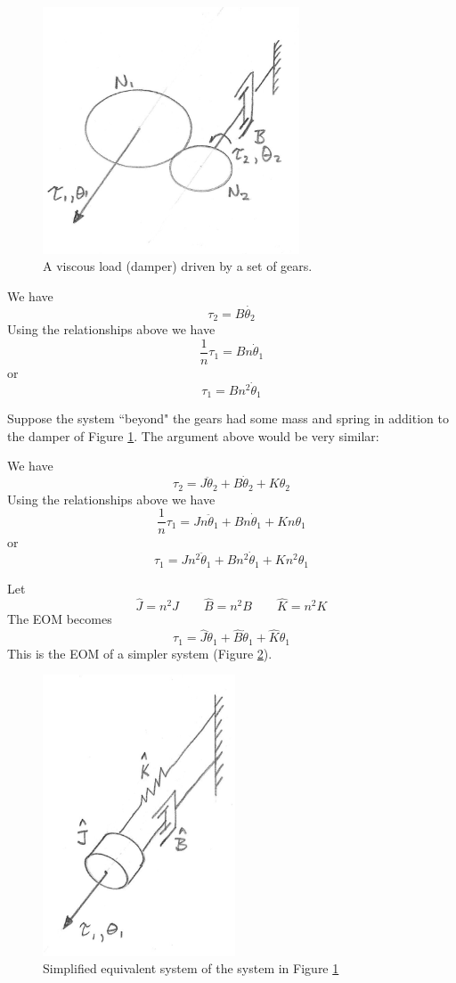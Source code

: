 \begin{figure}\centering
\includegraphics[width=3.0in]{figs03/00745a.png}
\caption{A viscous load (damper) driven by a set of gears.}\label{dampergears}
\end{figure}

We have
\[
\tau_2 = B \dot{\theta_2}
\]
Using the relationships above we have
\[
\frac{1}{n}\tau_1 = Bn\dot{\theta}_1
\]
or
\[
\tau_1 = Bn^2\dot{\theta}_1
\]

Suppose the system ``beyond" the gears had some mass and spring in addition to the damper of Figure \ref{dampergears}. The argument above would be very similar:

We have
\[
\tau_2 = J \ddot{\theta}_2 + B \dot{\theta}_2 + K \theta_2
\]
Using the relationships above we have
\[
\frac{1}{n}\tau_1 =J n \ddot{\theta}_1 + B n\dot{\theta}_1 + K n\theta_1
\]
or
\[
\tau_1 =J n^2 \ddot{\theta}_1 + B n^2\dot{\theta}_1 + K n^2\theta_1
\]

Let
\[
\hat{J} = n^2J \qquad \hat{B} = n^2B \qquad \hat{K} = n^2 K
\]
The EOM becomes
\[
\tau_1 =\hat{J}\ddot{\theta}_1 + \hat{B} \dot{\theta}_1 + \hat{K} \theta_1
\]
This is the EOM of a simpler system (Figure \ref{simplifiedgearsys}).

\begin{figure}\centering
\includegraphics[width=2.25in]{figs03/00746a.png}
\caption{Simplified equivalent system of the system in Figure \ref{dampergears}}\label{simplifiedgearsys}
\end{figure}



